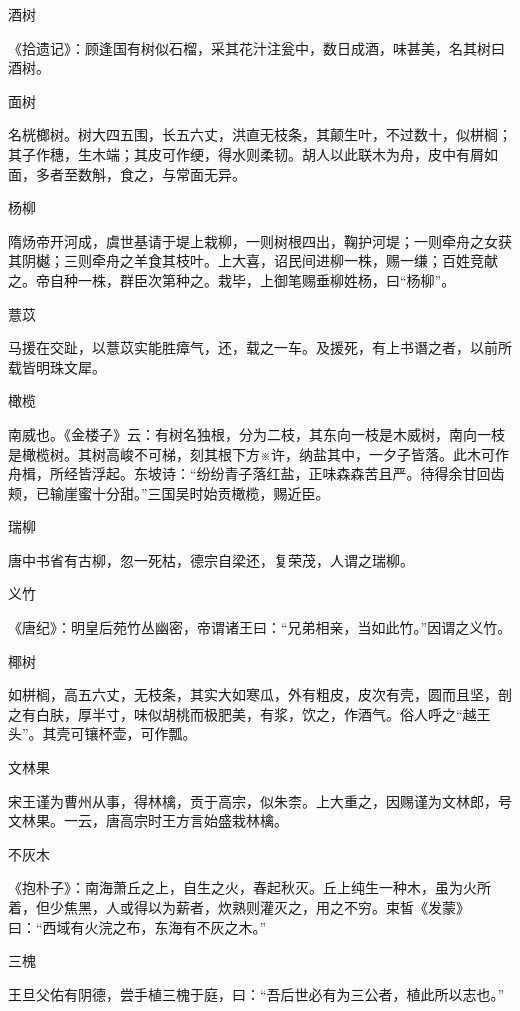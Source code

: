 \documentclass[a4paper,12pt,UTF8,twoside]{ctexbook}
\begin{document}
    酒树
    
    《拾遗记》：顾逢国有树似石榴，采其花汁注瓮中，数日成酒，味甚美，名其树曰酒树。
    
    面树
    
    名桄榔树。树大四五围，长五六丈，洪直无枝条，其颠生叶，不过数十，似栟榈；其子作穗，生木端；其皮可作绠，得水则柔韧。胡人以此联木为舟，皮中有屑如面，多者至数斛，食之，与常面无异。
    
    杨柳
    
    隋炀帝开河成，虞世基请于堤上栽柳，一则树根四出，鞠护河堤；一则牵舟之女获其阴樾；三则牵舟之羊食其枝叶。上大喜，诏民间进柳一株，赐一缣；百姓竞献之。帝自种一株，群臣次第种之。栽毕，上御笔赐垂柳姓杨，曰“杨柳”。
    
    薏苡
    
    马援在交趾，以薏苡实能胜瘴气，还，载之一车。及援死，有上书谮之者，以前所载皆明珠文犀。
    
    橄榄
    
    南威也。《金楼子》云：有树名独根，分为二枝，其东向一枝是木威树，南向一枝是橄榄树。其树高峻不可梯，刻其根下方※许，纳盐其中，一夕子皆落。此木可作舟楫，所经皆浮起。东坡诗：“纷纷青子落红盐，正味森森苦且严。待得余甘回齿颊，已输崖蜜十分甜。”三国吴时始贡橄榄，赐近臣。
    
    瑞柳
    
    唐中书省有古柳，忽一死枯，德宗自梁还，复荣茂，人谓之瑞柳。
    
    义竹
    
    《唐纪》：明皇后苑竹丛幽密，帝谓诸王曰：“兄弟相亲，当如此竹。”因谓之义竹。
    
    椰树
    
    如栟榈，高五六丈，无枝条，其实大如寒瓜，外有粗皮，皮次有壳，圆而且坚，剖之有白肤，厚半寸，味似胡桃而极肥美，有浆，饮之，作酒气。俗人呼之“越王头”。其壳可镶杯壶，可作瓢。
    
    文林果
    
    宋王谨为曹州从事，得林檎，贡于高宗，似朱柰。上大重之，因赐谨为文林郎，号文林果。一云，唐高宗时王方言始盛栽林檎。
    
    不灰木
    
    《抱朴子》：南海萧丘之上，自生之火，春起秋灭。丘上纯生一种木，虽为火所着，但少焦黑，人或得以为薪者，炊熟则灌灭之，用之不穷。束皙《发蒙》曰：“西域有火浣之布，东海有不灰之木。”
    
    三槐
    
    王旦父佑有阴德，尝手植三槐于庭，曰：“吾后世必有为三公者，植此所以志也。”
    
\end{document}
